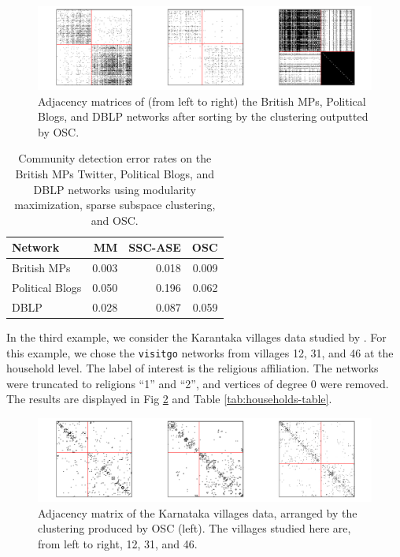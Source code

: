 \documentclass[12pt]{article}
\begin{document}
\begin{figure}[H]

{\centering \includegraphics{summary_files/figure-latex/mp-1}

}

\caption{Adjacency matrices of (from left to right) the British MPs, Political Blogs, and DBLP networks after sorting by the clustering outputted by OSC.}\label{fig:mp}
\end{figure}

\begin{table}

\caption{\label{tab:unnamed-chunk-6}Community detection error rates on the British MPs Twitter, Political Blogs, and DBLP networks using modularity maximization, sparse subspace clustering, and OSC.}
\centering
\begin{tabular}[t]{l|r|r|r}
\hline
Network & MM & SSC-ASE & OSC\\
\hline
British MPs & 0.003 & 0.018 & 0.009\\
\hline
Political Blogs & 0.050 & 0.196 & 0.062\\
\hline
DBLP & 0.028 & 0.087 & 0.059\\
\hline
\end{tabular}
\end{table}

In the third example, we consider the Karantaka villages data studied by
\citet{DVN/U3BIHX_2013}. For this example, we chose the \texttt{visitgo}
networks from villages 12, 31, and 46 at the household level. The label
of interest is the religious affiliation. The networks were truncated to
religions ``1'' and ``2'', and vertices of degree 0 were removed. The results are displayed in Fig \ref{fig:households-figure} and Table \ref{tab:households-table}.

\begin{figure}[H]

{\centering \includegraphics{summary_files/figure-latex/unnamed-chunk-7-1}

}

\caption{Adjacency matrix of the Karnataka villages data, arranged by the clustering produced by OSC (left). The villages studied here are, from left to right, 12, 31, and 46.}\label{fig:households-figure}
\end{figure}
\end{document}
